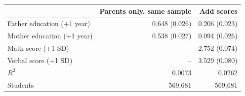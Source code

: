 \begin{tabular}{lrr}
\hline
 & Parents only, same sample & Add scores \\
\hline
Father education (+1 year) & 0.648 (0.026) & 0.206 (0.023) \\
Mother education (+1 year) & 0.538 (0.027) & 0.094 (0.026) \\
Math score (+1 SD) & -- & 2.752 (0.074) \\
Verbal score (+1 SD) & -- & 3.529 (0.080) \\
$R^2$ & 0.0073 & 0.0262 \\
Students & 569,681 & 569,681 \\
\hline
\end{tabular}
